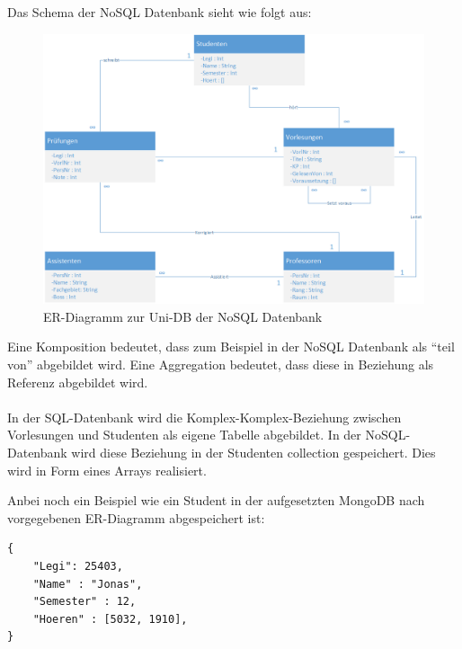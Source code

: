 \newpage
Das Schema der NoSQL Datenbank sieht wie folgt aus:
\begin{figure}[h] 
	\centering
		\includegraphics[width=1\textwidth]{./pictures/NoSQL-DB_ER_Diagramm_UNI-DB.png}
	\caption{ER-Diagramm zur Uni-DB der NoSQL Datenbank}
	\label{fig:uni-dbNoSQL}
\end{figure}
\noindent
Eine Komposition bedeutet, dass zum Beispiel in der NoSQL Datenbank als ``teil von''
abgebildet wird. Eine Aggregation bedeutet, dass diese in Beziehung  als
Referenz abgebildet wird.
\\\\
In der SQL-Datenbank wird die Komplex-Komplex-Beziehung zwischen Vorlesungen und Studenten als eigene Tabelle abgebildet. In der NoSQL-Datenbank wird diese Beziehung in der Studenten collection gespeichert. Dies wird in Form eines Arrays realisiert.

\newpage
\noindent
Anbei noch ein Beispiel wie ein Student in der aufgesetzten MongoDB nach vorgegebenen ER-Diagramm abgespeichert ist:
\begin{lstlisting}[basicstyle=\scriptsize]
{
	"Legi": 25403,
	"Name" : "Jonas",
	"Semester" : 12,
	"Hoeren" : [5032, 1910],
}
\end{lstlisting}



